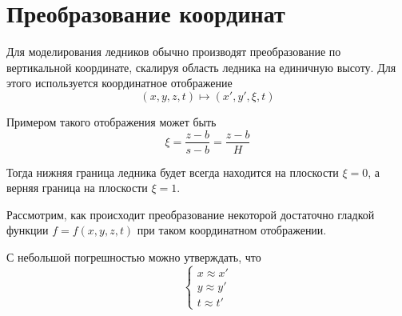 \section*{Преобразование координат}

Для моделирования ледников обычно производят преобразование
по вертикальной координате, скалируя область ледника на
единичную высоту.
Для этого используется координатное отображение
\begin{equation*}
    \left(
        x, y, z, t
    \right)
    \mapsto
    \left(
        x', y', \xi, t
    \right)
\end{equation*}

Примером такого отображения может быть 
\begin{equation*}
    \xi
    =
    \frac
        {z-b}
        {s-b}
    =
    \frac
        {z-b}
        {H}
\end{equation*}

Тогда нижняя граница ледника будет всегда находится на 
плоскости $\xi = 0$, а верняя граница на плоскости $\xi = 1$.

Рассмотрим, как происходит преобразование некоторой достаточно
гладкой функции $f=f(x,y,z,t)$ при таком координатном отображении.

С небольшой погрешностью можно утверждать, что
\begin{equation*}
    \begin{cases}
        x \approx x'
        \\
        y \approx y'
        \\
        t \approx t'
    \end{cases}
\end{equation*}

